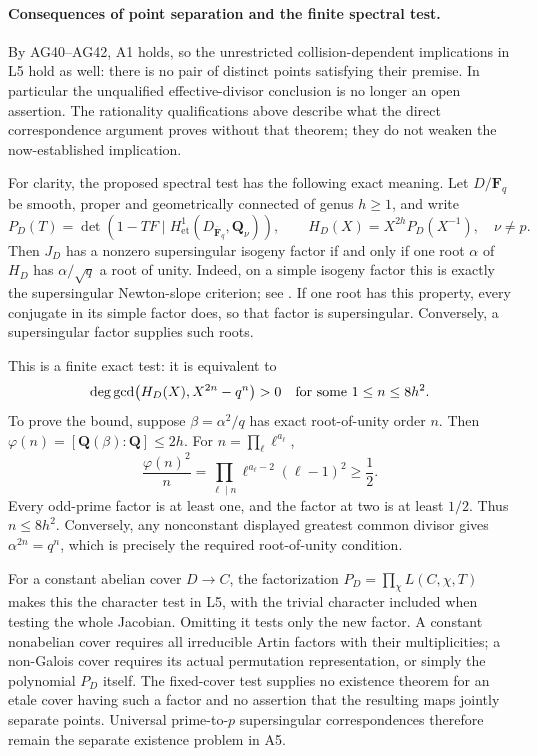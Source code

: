\paragraph{Consequences of point separation and the finite spectral test.}
By AG40--AG42, A1 holds, so the unrestricted collision-dependent
implications in L5 hold as well: there is no pair of distinct
points satisfying their premise. In particular the unqualified
effective-divisor conclusion is no longer an open assertion.
The rationality qualifications above describe what the direct
correspondence argument proves without that theorem; they do
not weaken the now-established implication.

For clarity, the proposed spectral test has the following exact
meaning. Let $D/\mathbf F_q$ be smooth, proper and geometrically
connected of genus $h\ge1$, and write
\[
 P_D(T)=\det(1-TF\mid H^1_{\mathrm{et}}
       (D_{\overline{\mathbf F}_q},\mathbf Q_\nu)),
 \qquad
 H_D(X)=X^{2h}P_D(X^{-1}),\quad \nu\ne p.
\]
Then $J_D$ has a nonzero supersingular isogeny factor if and
only if one root $\alpha$ of $H_D$ has
$\alpha/\sqrt q$ a root of unity. Indeed, on a simple
isogeny factor this is exactly the supersingular
Newton-slope criterion; see
\cite[\S\S21.20--21.21(3)]{AC_Oort2008}. If one root has
this property, every conjugate in its simple factor does,
so that factor is supersingular. Conversely, a
supersingular factor supplies such roots.

This is a finite exact test: it is equivalent to
\[
 \deg\gcd\bigl(H_D(X),X^{2n}-q^n\bigr)>0
 \quad\hbox{for some }1\le n\le8h^2.
\]
To prove the bound, suppose $\beta=\alpha^2/q$ has exact
root-of-unity order $n$. Then
$\varphi(n)=[\mathbf Q(\beta):\mathbf Q]\le2h$.
For $n=\prod_\ell\ell^{a_\ell}$,
\[
 \frac{\varphi(n)^2}{n}
       =\prod_{\ell\mid n}\ell^{a_\ell-2}(\ell-1)^2
       \ge\frac12.
\]
Every odd-prime factor is at least one, and the factor
at two is at least $1/2$. Thus $n\le8h^2$.
Conversely, any nonconstant displayed greatest common
divisor gives $\alpha^{2n}=q^n$, which is precisely the
required root-of-unity condition.

For a constant abelian cover $D\to C$, the factorization
$P_D=\prod_\chi L(C,\chi,T)$ makes this the character
test in L5, with the trivial character included when
testing the whole Jacobian. Omitting it tests only the
new factor. A constant nonabelian cover requires all
irreducible Artin factors with their multiplicities;
a non-Galois cover requires its actual permutation
representation, or simply the polynomial $P_D$ itself.
The fixed-cover test supplies no existence theorem for
an etale cover having such a factor and no assertion
that the resulting maps jointly separate points.
Universal prime-to-$p$ supersingular correspondences
therefore remain the separate existence problem in A5.
